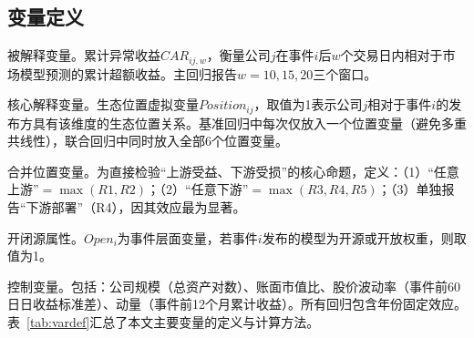 \documentclass[11pt,fontset=fandol,a4paper]{ctexart}
\newcommand{\changed}[1]{#1}
\begin{document}
\subsection{变量定义}

被解释变量。累计异常收益$CAR_{ij,w}$，衡量公司$j$在事件$i$后$w$个交易日内相对于市场模型预测的累计超额收益。主回归报告$w=10,15,20$三个窗口。

核心解释变量。生态位置虚拟变量$Position_{ij}$，取值为1表示公司$j$相对于事件$i$的发布方具有该维度的生态位置关系。基准回归中每次仅放入一个位置变量（避免多重共线性），联合回归中同时放入全部6个位置变量。

\changed{合并位置变量。为直接检验“上游受益、下游受损”的核心命题，定义：（1）“任意上游”$=\max(R1,R2)$；（2）“任意下游”$=\max(R3,R4,R5)$；（3）单独报告“下游部署”（R4），因其效应最为显著。}

开闭源属性。$Open_i$为事件层面变量，若事件$i$发布的模型为开源或开放权重，则取值为1。

控制变量。包括：公司规模（总资产对数）、账面市值比、股价波动率（事件前60日日收益标准差）、动量（事件前12个月累计收益）。所有回归包含年份固定效应。表~\ref{tab:vardef}汇总了本文主要变量的定义与计算方法。
\end{document}
